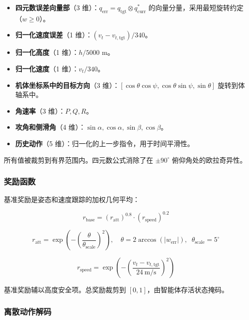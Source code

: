 \documentclass{article}
\begin{document}
\begin{itemize}
  \item \textbf{四元数误差向量部}（3 维）：$q_{\text{err}} = q_{\text{tgt}} \otimes q_{\text{curr}}^*$ 的向量分量，采用最短旋转约定（$w \geq 0$）。
  \item \textbf{归一化速度误差}（1 维）：$(v_t - v_{t,\text{tgt}}) / 340$。
  \item \textbf{归一化高度}（1 维）：$h / 5000$ m。
  \item \textbf{归一化速度}（1 维）：$v_t / 340$。
  \item \textbf{机体坐标系中的目标方向}（3 维）：$[\cos\theta\cos\psi, \cos\theta\sin\psi, \sin\theta]$ 旋转到体轴系中。
  \item \textbf{角速率}（3 维）：$P, Q, R$。
  \item \textbf{攻角和侧滑角}（4 维）：$\sin\alpha, \cos\alpha, \sin\beta, \cos\beta$。
  \item \textbf{历史动作}（5 维）：归一化的上一步指令，用于时间平滑性。
\end{itemize}

所有值被裁剪到有界范围内。四元数公式消除了在 $\pm90^\circ$ 俯仰角处的欧拉奇异性。

\subsubsection{奖励函数}

基准奖励是姿态和速度跟踪的加权几何平均：

\begin{equation}
  r_{\text{base}} = (r_{\text{att}})^{0.8} \cdot (r_{\text{speed}})^{0.2}
\end{equation}

\begin{equation}
  r_{\text{att}} = \exp\left(-\left(\frac{\theta}{\theta_{\text{scale}}}\right)^2\right), \quad \theta = 2\arccos(|w_{\text{err}}|), \;\; \theta_{\text{scale}} = 5^\circ
\end{equation}

\begin{equation}
  r_{\text{speed}} = \exp\left(-\left(\frac{v_t - v_{t,\text{tgt}}}{24~\text{m/s}}\right)^2\right)
\end{equation}

基准奖励辅以高度安全项。总奖励裁剪到 $[0, 1]$，由智能体存活状态掩码。

\subsubsection{离散动作解码}
\end{document}
